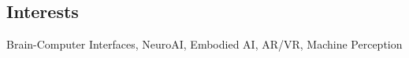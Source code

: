 \subsection*{\textbf{Interests}}
Brain-Computer Interfaces, NeuroAI, Embodied AI, AR/VR, Machine Perception